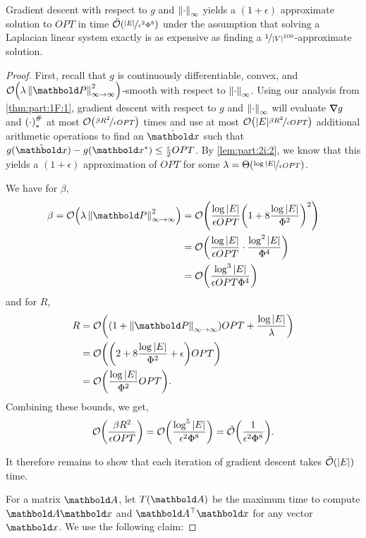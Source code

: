 \documentclass{tufte-handout}
\begin{document}
\begin{thm}
Gradient descent with respect to $g$ and $\left\| \cdot \right\|_\infty$ yields a $(1+\epsilon)$ approximate solution to $OPT$ in time $\TildeLandauO{\nicefrac{|E|}{\epsilon^2 \Phi^8}}$ under the assumption that solving a Laplacian linear system exactly is as expensive as finding a $\nicefrac{1}{|V|^{100}}$-approximate solution.
\end{thm}
\begin{proof} First, recall that $g$ is continuously differentiable, convex, and $\LandauO{\lambda \norm{\mP}_\iti^2}$-smooth with respect to $\left\| \cdot \right\|_\infty$. Using our analysis from \cref{thm:part:1F:1}, gradient descent with respect to $g$ and $\left\| \cdot \right\|_\infty$ will evaluate $\nabla\!\!\!\!\!\nabla g$ and $\left( \cdot \right)^\#_*$ at most $\LandauO{\nicefrac{\beta R^2}{\epsilon OPT}}$ times and use at most $\LandauO{|E| \nicefrac{\beta R^2}{\epsilon OPT}}$ additional arithmetic operations to find an $\hat{\vx}$ such that $g(\hat{\vx}) - g(\s{\vx}) \leq \frac{\epsilon}{2}OPT$. By \cref{lem:part:2i:2}, we know that this yields a $(1+\epsilon)$ approximation of $OPT$ for some $\lambda = \LandauTheta{\nicefrac{\log |E|}{\epsilon OPT}}$.

We have for $\beta$, \begin{align*}
    \beta = \LandauO{\lambda \norm{\mP}_\iti^2} &= \LandauO{\frac{\log |E|}{\epsilon OPT}\parentheses*{1 + 8\frac{\log |E|}{\Phi^2}}^2} \\
    &= \LandauO{\frac{\log |E|}{\epsilon OPT} \cdot \frac{\log^2 |E|}{\Phi^4}} \\
    &= \LandauO{\frac{\log^3 |E|}{\epsilon OPT \Phi^4}}
\end{align*} and for $R$, \begin{align*}
    R &= \LandauO{(1 + \norm{\mP}_\iti)OPT + \frac{\log |E|}{\lambda}} \\
    &= \LandauO{\parentheses*{2 + 8\frac{\log |E|}{\Phi^2} + \epsilon}OPT} \\
    &= \LandauO{\frac{\log |E|}{\Phi^2} OPT}.
\end{align*} Combining these bounds, we get, \begin{align*}
    \LandauO{\frac{\beta R^2}{\epsilon OPT}} = \LandauO{\frac{\log^5 |E|}{\epsilon^2 \Phi^8}} = \TildeLandauO{\frac{1}{\epsilon^2 \Phi^8}}.
\end{align*}

It therefore remains to show that each iteration of gradient descent takes $\TildeLandauO{|E|}$ time.

For a matrix $\mA$, let $T(\mA)$ be the maximum time to compute $\mA \vx$ and $\trans{\mA}\vx$ for any vector $\vx$. We use the following claim:


\end{proof}
\end{document}
